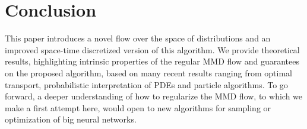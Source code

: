 \section{Conclusion}

This paper introduces a novel flow over the space of distributions and an improved space-time discretized version of this algorithm. We provide theoretical results, highlighting intrinsic properties of the regular MMD flow and guarantees on the proposed algorithm, based on many recent results ranging from optimal transport, probabilistic interpretation of PDEs and particle algorithms. To go forward, a deeper understanding of how to regularize the MMD flow, to which we make a first attempt here, would open to new algorithms for sampling or optimization of big neural networks.%
